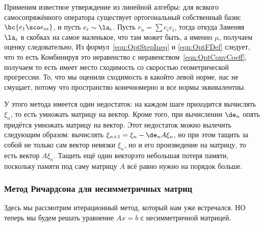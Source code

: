 \documentclass[a4paper]{article}
\begin{document}
Применим известное утверждение из линейной алгебры: для всякого самосопряжённого оператора существует
ортогональный собственный базис $\hc{e_1\sco e_m}$, и пусть $e_i \sim \la_i$.
Пусть $r_n = \sum c_i e_i$, тогда
откуда
Заменяя $\la_i$ в скобках на самое маленькое, что там может быть, а именно $\mu$, получаем
оценку
следовательно,
Из формул~\eqref{eqn:OptStepIneq} и \eqref{eqn:OptFDef} следует, что
то есть
Комбинируя это неравенство с неравенством~\eqref{eqn:OptConvCoeff}, получаем
то есть имеет место сходимость со скоростью геометрической прогрессии.
То, что мы оценили сходимость в какой\д то левой норме, нас не смущает,
потому что пространство конечномерно и все нормы эквивалентны.

У этого метода имеется один недостаток: на каждом шаге приходится вычислять $\xi_n$,
то есть умножать матрицу на вектор. Кроме того, при вычислении $\de_n$ опять придётся
умножать матрицу на вектор. Этот недостаток можно вылечить следующим образом:
вычислять $\xi_{n+1} = \xi_n - \de_n A \xi_n$, но при этом тащить за собой не только сам вектор невязки $\xi_n$,
но и его произведение на матрицу, то есть вектор $A\xi_n$. Тащить ещё один вектор\т это небольшая потеря памяти, поскольку
памяти под саму матрицу $A$ всё равно нужно на порядок больше.

\subsubsection{Метод Ричардсона для несимметричных матриц}

Здесь мы рассмотрим итерационный метод, который нам уже встречался. НО теперь мы будем решать уравнение $Ax = b$
с несимметричной матрицей.
\end{document}
